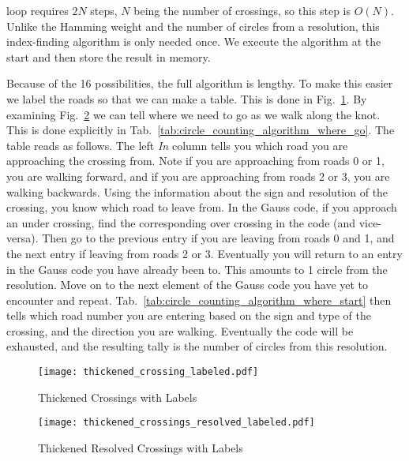 \documentclass{article}
\theoremstyle{plain}
\begin{document}
        loop requires $2N$ steps, $N$ being the number of crossings, so this
        step is $O(N)$. Unlike the Hamming weight and the number of circles
        from a resolution, this index-finding algorithm is only needed once. We
        execute the algorithm at the start and then store the result in
        memory.
        \par\hfill\par
        Because of the 16 possibilities, the full algorithm is lengthy. To make
        this easier we label the roads so that we can make a table. This is
        done in Fig.~\ref{fig:thickened_crossings_labeled}. By examining
        Fig.~\ref{fig:thickened_crossings_resolved_labeled} we can tell where
        we need to go as we walk along the knot. This is done explicitly in
        Tab.~\ref{tab:circle_counting_algorithm_where_go}. The table reads as follows.
        The left \textit{In} column tells you which road you are approaching the
        crossing from. Note if you are approaching from roads 0 or 1, you are
        walking forward, and if you are approaching from roads 2 or 3, you are
        walking backwards. Using the information about the sign and resolution
        of the crossing, you know which road to leave from. In the Gauss code,
        if you approach an under crossing, find the corresponding over crossing
        in the code (and vice-versa). Then go to the previous entry if you are
        leaving from roads 0 and 1, and the next entry if leaving from roads
        2 or 3. Eventually you will return to an entry in
        the Gauss code you have already been to. This amounts to 1 circle from
        the resolution. Move on to the next element of the Gauss code you have
        yet to encounter and repeat. Tab.~\ref{tab:circle_counting_algorithm_where_start}
        then tells which road number you are entering based on the sign and type
        of the crossing, and the direction you are walking. Eventually the code
        will be exhausted, and the resulting tally is the number of
        circles from this resolution.
        \begin{figure}
            \centering
            \texttt{[image: thickened\_crossing\_labeled.pdf]}
            \caption{Thickened Crossings with Labels}
            \label{fig:thickened_crossings_labeled}
        \end{figure}
        \begin{figure}
            \centering
            \texttt{[image: thickened\_crossings\_resolved\_labeled.pdf]}
            \caption{Thickened Resolved Crossings with Labels}
            \label{fig:thickened_crossings_resolved_labeled}
        \end{figure}
\end{document}

